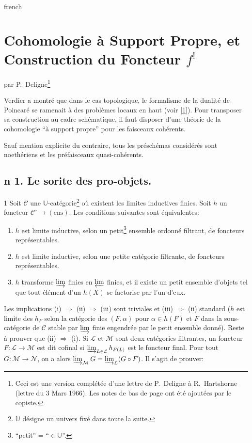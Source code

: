 \begin{hyphenrules}{french}
\chapter{Cohomologie à Support Propre, et Construction du Foncteur $f^!$}
par P.\ Deligne\footnote{Ceci est une version compl\'et\'ee d'une lettre de P.\ Deligne \`a R.\ Hartshorne (lettre du 3 Mars 1966). Les notes de bas de page ont \'et\'e ajout\'ees par le copiste.}

Verdier a montr\'e que dans le cas topologique, le formalisme de la dualit\'e de Poincar\'e se ramenait \`a des probl\`emes locaux en haut (voir \hyperref[app:bib1]{[1]}). Pour transposer sa construction au cadre sch\'ematique, il faut disposer d'une th\'eorie de la cohomologie ``\`a support propre'' pour les faisceaux coh\'erents.

Sauf mention explicite du contraire, tous les pr\'esch\'emas consid\'er\'es sont noeth\'eriens et les pr\'efaisceaux quasi-coh\'erents.

\section*{n\textdegree{} 1. Le sorite des pro-objets.}\label{app:sec1}

\begin{bookproposition}{1}\label{app:prop1}
Soit $\mathcal{C}$ une $\mathbb{U}$-cat\'egorie\footnote{$\mathbb{U}$ d\'esigne un univers fix\'e dans toute la suite.} o\`u existent les limites inductives finies. Soit $h$ un foncteur $\mathcal{C}^{\circ} \to (\text{ens})$. Les conditions suivantes sont \'equivalentes:
\begin{enumerate}
\item[(i)] $h$ est limite inductive, selon un petit\footnote{``petit'' = ``$\in \mathbb{U}$''.} ensemble ordonn\'e filtrant, de foncteurs repr\'esentables.
\item[(ii)] $h$ est limite inductive, selon une petite cat\'egorie filtrante, de foncteurs repr\'esentables.
\item[(iii)] $h$ transforme $\varinjlim$ finies en $\varprojlim$ finies, et il existe un petit ensemble d'objets tel que tout \'el\'ement d'un $h(X)$ se factorise par l'un d'eux.
\end{enumerate}
\end{bookproposition}

Les implications (i) $\Rightarrow$ (ii) $\Rightarrow$ (iii) sont triviales et (iii) $\Rightarrow$ (ii) standard ($h$ est limite des $h_F$ selon la cat\'egorie des $(F, \alpha)$ pour $\alpha \in h(F)$ et $F$ dans la sous-cat\'egorie de $\mathcal{C}$ stable par $\varinjlim$ finie engendr\'ee par le petit ensemble donn\'e). Reste \`a prouver que (ii) $\Rightarrow$ (i). Si $\mathcal{L}$ et $\mathcal{M}$ sont deux cat\'egories filtrantes, un foncteur $F: \mathcal{L} \to \mathcal{M}$ est dit cofinal si $\varinjlim_{L\in\mathcal L} h_{F(L)}$ est le foncteur final. Pour tout $G\colon\mathcal M\to\mathcal N$, on a alors $\varinjlim_{\mathcal M}G=\varinjlim_{\mathcal L}(G\circ F)$. Il s'agit de prouver:


\end{hyphenrules}
